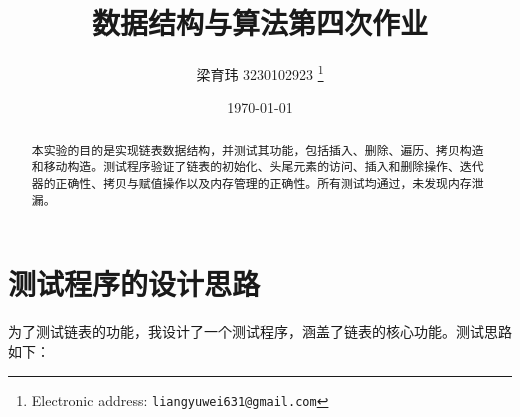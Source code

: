 \documentclass[UTF8]{ctexart}
\begin{document}
\pagestyle{fancy}
\fancyhead{}
\title{数据结构与算法第四次作业}

\author{梁育玮 3230102923
  \thanks{Electronic address: \texttt{liangyuwei631@gmail.com}}}


\date{\today}

\maketitle
\begin{abstract}
    本实验的目的是实现链表数据结构，并测试其功能，包括插入、删除、遍历、拷贝构造和移动构造。测试程序验证了链表的初始化、头尾元素的访问、插入和删除操作、迭代器的正确性、拷贝与赋值操作以及内存管理的正确性。所有测试均通过，未发现内存泄漏。
\end{abstract}

\section{测试程序的设计思路}

为了测试链表的功能，我设计了一个测试程序，涵盖了链表的核心功能。测试思路如下：
\end{document}
